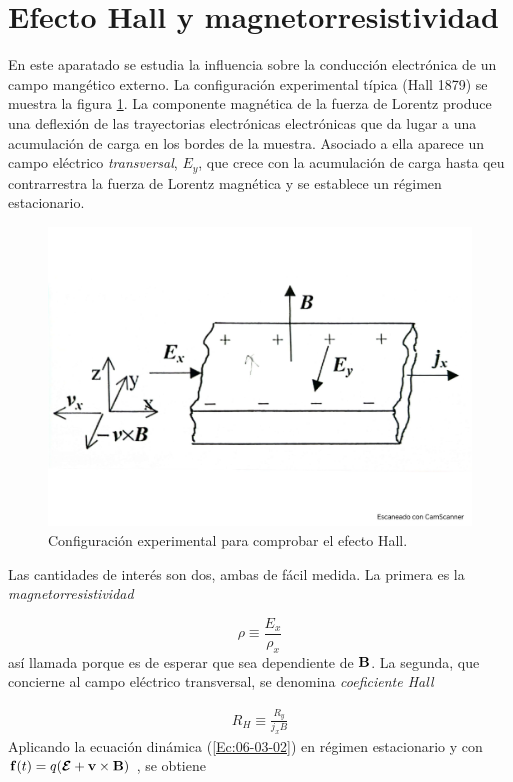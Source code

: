 \section{Efecto Hall y magnetorresistividad}

En este aparatado se estudia la influencia sobre la conducción electrónica de un campo mangético externo. La configuración experimental típica (Hall 1879) se muestra la figura \ref{Fig:06-07}. La componente magnética de la fuerza de Lorentz produce una deflexión de las trayectorias electrónicas electrónicas que da lugar a una acumulación de carga en los bordes de la muestra. Asociado a ella aparece un campo eléctrico \textit{transversal}, $E_y$, que crece con la acumulación de carga hasta qeu contrarrestra la fuerza de Lorentz magnética y se establece un régimen estacionario.

\begin{figure}[h!] \centering
    \includegraphics[scale=0.35]{Cuerpo/Ch_06/Fotos libro 7.pdf}
    \caption{Configuración experimental para comprobar el efecto Hall.}
    \label{Fig:06-07}
\end{figure}  

Las cantidades de interés son dos, ambas de fácil medida. La primera es la \textit{magnetorresistividad}

\begin{equation}
	\rho \equiv \frac{E_x}{\rho_x} \label{Ec:06-06-01}
\end{equation}
así llamada porque es de esperar que sea dependiente de $\mathbf{B}$. La segunda, que concierne al campo eléctrico transversal, se denomina \textit{coeficiente  Hall}

\begin{eqnarray}
	R_H \equiv \frac{R_y}{j_x B} \label{Ec:06-06-02}
\end{eqnarray}
Aplicando la ecuación dinámica (\ref{Ec:06-03-02}) en régimen estacionario y con $\mathbf{f} (t) = q(\boldsymbol{\mathcal{E}} + \mathbf{v} \times \mathbf{B})$ , se obtiene 


